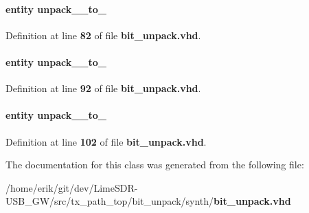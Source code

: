 \paragraph[{unpack\+\_\+32\+\_\+to\+\_\+48\+\_\+inst0}]{ {\bfseries \textcolor{keywordflow}{entity}\textcolor{vhdlchar}{ }\textcolor{vhdlchar}{unpack\+\_\+\_\+to\+\_}\textcolor{vhdlchar}{ }} \hspace{0.3cm}{\ttfamily [Instantiation]}}\label{classbit__unpack_1_1arch_a75bd24a057b6fcfe9ceff41ddf5a5a96}


Definition at line {\bf 82} of file {\bf bit\+\_\+unpack.\+vhd}.

\paragraph[{unpack\+\_\+32\+\_\+to\+\_\+56\+\_\+inst1}]{ {\bfseries \textcolor{keywordflow}{entity}\textcolor{vhdlchar}{ }\textcolor{vhdlchar}{unpack\+\_\+\_\+to\+\_}\textcolor{vhdlchar}{ }} \hspace{0.3cm}{\ttfamily [Instantiation]}}\label{classbit__unpack_1_1arch_af94b88cfc56125925226323000d210f0}


Definition at line {\bf 92} of file {\bf bit\+\_\+unpack.\+vhd}.

\paragraph[{unpack\+\_\+32\+\_\+to\+\_\+64\+\_\+inst2}]{ {\bfseries \textcolor{keywordflow}{entity}\textcolor{vhdlchar}{ }\textcolor{vhdlchar}{unpack\+\_\+\_\+to\+\_}\textcolor{vhdlchar}{ }} \hspace{0.3cm}{\ttfamily [Instantiation]}}\label{classbit__unpack_1_1arch_ad1e0b268e2622febccc728b66a7f9c6b}


Definition at line {\bf 102} of file {\bf bit\+\_\+unpack.\+vhd}.



The documentation for this class was generated from the following file\+:\begin{DoxyCompactItemize}
\item 
/home/erik/git/dev/\+Lime\+S\+D\+R-\/\+U\+S\+B\+\_\+\+G\+W/src/tx\+\_\+path\+\_\+top/bit\+\_\+unpack/synth/{\bf bit\+\_\+unpack.\+vhd}\end{DoxyCompactItemize}
